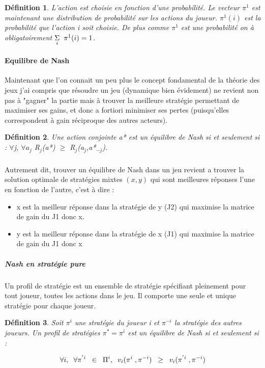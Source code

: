 \documentclass[a4paper, 12pt, twoside]{article}
\newtheorem{definition}{Définition}
\begin{document}
\begin{definition}
L'action est choisie en fonction d'une probabilité. Le vecteur $\pi^{1}$ est maintenant une distribution  de probabilité sur les actions du joueur. $\pi^{1}(i)$ est la probabilité que l'action i soit choisie. De plus comme  $\pi^{1}$ est une probabilité on à obligatoirement $\underset{i}{\Sigma}  \hspace{0,2 cm} \pi^{1}(i) = 1$.
\end{definition}

\paragraph{Equilibre de Nash}
{Maintenant que l'on connait un peu plus le concept fondamental de la \textsf{théorie des jeux} j'ai compris que résoudre un jeu (dynamique bien évidement) ne revient non pas à "gagner" la partie mais à trouver la meilleure stratégie permettant de maximiser ses gains, et donc a fortiori minimiser ses pertes (puisqu'elles correspondent à gain réciproque des autres acteurs).} 

\begin{definition}
Une action conjointe a* est un équilibre de Nash si et seulement si : $ \forall $j, $ \forall a_{j}$ R$ _{j} $(a*) $ \geq $ R$ _{j} $(a$ _{j} $,a*$ _{-j} $).
\end{definition}


\subparagraph*{}{Autrement dit, trouver \textsf{un équilibre de Nash} dans un jeu revient a trouver la solution optimale de stratégies mixtes $(x,y)$  qui sont meilleures réponses l'une en fonction de l'autre, c'est à dire :}
\begin{itemize}
\item x est la meilleur réponse dans la stratégie de y (J2) qui maximise la matrice de gain du J1 donc x.
\item y est la meilleur réponse dans la stratégie de x (J1) qui maximise la matrice de gain du J1  donc x
\end{itemize}  


\subparagraph{Nash en stratégie pure}{Un profil de stratégie est un ensemble de stratégie spécifiant pleinement pour tout joueur, toutes les actions dans le jeu. Il comporte une seule et unique stratégie pour chaque joueur.}
\begin{definition}
Soit $\pi^{i} $ une stratégie du joueur i et $ \pi^{-i} $ la stratégie des autres joueurs. Un profil de stratégies $\pi^{*} = \pi^{i}$ est un équilibre de Nash si et seulement si :
\end{definition}
\begin{align*}
\forall i, \hspace{0,2 cm} \forall \pi^{'i} \hspace{0,2 cm} \in \hspace{0,2 cm} \Pi^{i}, \hspace{0,2 cm} v_{i}(\pi^{i}\hspace{0,1 cm}, \pi^{-i}) \hspace{0,2 cm} \geq \hspace{0,2 cm} v_{i}(\pi^{'i}\hspace{0,1 cm}, \pi^{-i})
\end{align*}
\end{document}
